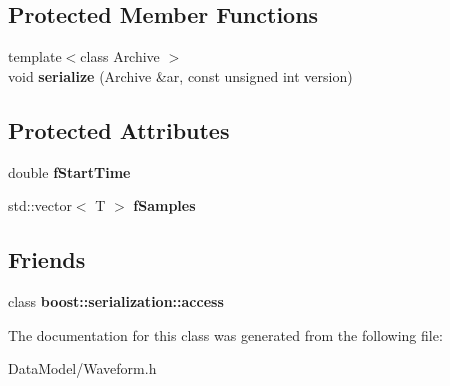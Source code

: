 \subsection*{Protected Member Functions}
\begin{DoxyCompactItemize}
\item 
\hypertarget{classWaveform_a05fb82d5df8bc14d47a1593b23ef31e7}{{\footnotesize template$<$class Archive $>$ }\\void {\bfseries serialize} (Archive \&ar, const unsigned int version)}\label{classWaveform_a05fb82d5df8bc14d47a1593b23ef31e7}

\end{DoxyCompactItemize}
\subsection*{Protected Attributes}
\begin{DoxyCompactItemize}
\item 
\hypertarget{classWaveform_a2d586b50632273b1e10a3437a3140be0}{double {\bfseries f\-Start\-Time}}\label{classWaveform_a2d586b50632273b1e10a3437a3140be0}

\item 
\hypertarget{classWaveform_a3b535d8f472652894cd75933b1268fb4}{std\-::vector$<$ T $>$ {\bfseries f\-Samples}}\label{classWaveform_a3b535d8f472652894cd75933b1268fb4}

\end{DoxyCompactItemize}
\subsection*{Friends}
\begin{DoxyCompactItemize}
\item 
\hypertarget{classWaveform_ac98d07dd8f7b70e16ccb9a01abf56b9c}{class {\bfseries boost\-::serialization\-::access}}\label{classWaveform_ac98d07dd8f7b70e16ccb9a01abf56b9c}

\end{DoxyCompactItemize}


The documentation for this class was generated from the following file\-:\begin{DoxyCompactItemize}
\item 
Data\-Model/Waveform.\-h\end{DoxyCompactItemize}
